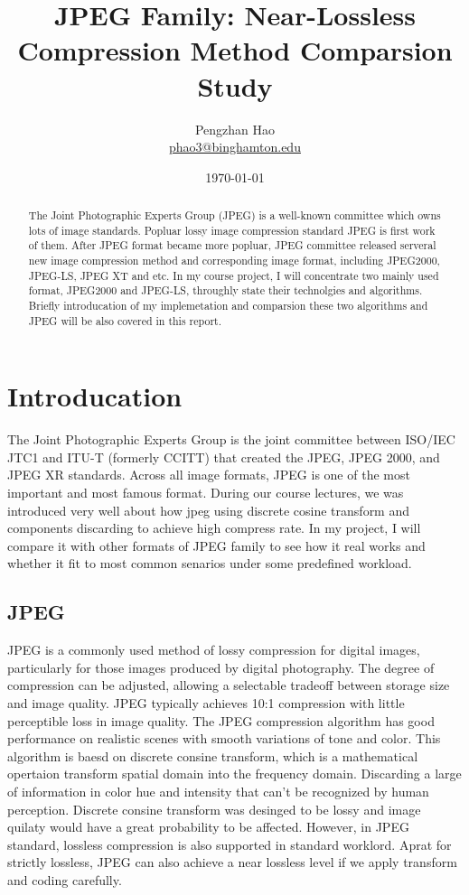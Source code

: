 \documentclass[UTF8, letterpaper, 14pt]{article}
\begin{document}
\title{JPEG Family: Near-Lossless Compression Method Comparsion Study}
\author{Pengzhan Hao \\ \href{mailto:phao3@binghamton.edu}{phao3@binghamton.edu}}
\date{\today}
\maketitle
\begin{abstract}
The Joint Photographic Experts Group (JPEG) is a well-known committee which owns lots of image standards. Popluar lossy image compression standard JPEG is first work of them. After JPEG format became more popluar, JPEG committee released serveral new image compression method and corresponding image format, including JPEG2000, JPEG-LS, JPEG XT and etc. In my course project, I will concentrate two mainly used format, JPEG2000 and JPEG-LS, throughly state their technolgies and algorithms. Briefly introducation of my implemetation and comparsion these two algorithms and JPEG will be also covered in this report.\\
\end{abstract}

\section{Introducation}
The Joint Photographic Experts Group is the joint committee between ISO/IEC JTC1 and ITU-T (formerly CCITT) that created the JPEG, JPEG 2000, and JPEG XR standards\cite{jpegcommiteewiki}. Across all image formats, JPEG is one of the most important and most famous format. During our course lectures, we was introduced very well about how jpeg using discrete cosine transform and components discarding to achieve high compress rate. In my project, I will compare it with other formats of JPEG family to see how it real works and whether it fit to most common senarios under some predefined workload.\\
\subsection{JPEG}
JPEG is a commonly used method of lossy compression for digital images, particularly for those images produced by digital photography. The degree of compression can be adjusted, allowing a selectable tradeoff between storage size and image quality. JPEG typically achieves 10:1 compression with little perceptible loss in image quality.\cite{jpegwiki} The JPEG compression algorithm has good performance on realistic scenes with smooth variations of tone and color. This algorithm is baesd on discrete consine transform, which is a mathematical opertaion transform spatial domain into the frequency domain. Discarding a large of information in color hue and intensity that can't be recognized by human perception. Discrete consine transform was desinged to be lossy and image quilaty would have a great probability to be affected. However, in JPEG standard, lossless compression is also supported in standard worklord. Aprat for strictly lossless, JPEG can also achieve a near lossless level if we apply transform and coding carefully.\\
\end{document}
